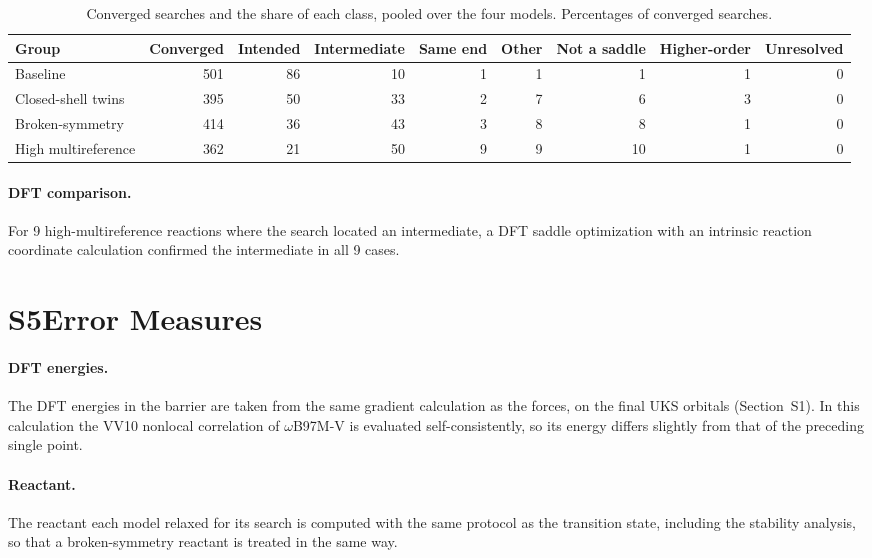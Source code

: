 \begin{table}[h]
  \caption{Converged searches and the share of each class, pooled over the four models. Percentages of converged searches.}
  \begin{tabular}{lrrrrrrrr}
    \hline
    Group & Converged & Intended & Intermediate & Same end & Other & Not a saddle & Higher-order & Unresolved \\
    \hline
    Baseline           & 501 & 86 & 10 & 1 & 1 & 1  & 1 & 0 \\
    Closed-shell twins & 395 & 50 & 33 & 2 & 7 & 6  & 3 & 0 \\
    Broken-symmetry    & 414 & 36 & 43 & 3 & 8 & 8  & 1 & 0 \\
    High multireference& 362 & 21 & 50 & 9 & 9 & 10 & 1 & 0 \\
    \hline
  \end{tabular}
\end{table}

\paragraph{DFT comparison.} For 9 high-multireference reactions where the search located an intermediate, a DFT saddle optimization with an intrinsic reaction coordinate calculation confirmed the intermediate in all 9 cases.

\section{S5\quad Error Measures}
\paragraph{DFT energies.} The DFT energies in the barrier are taken from the same gradient calculation as the forces, on the final UKS orbitals (Section~S1). In this calculation the VV10 nonlocal correlation of $\omega$B97M-V is evaluated self-consistently, so its energy differs slightly from that of the preceding single point.

\paragraph{Reactant.} The reactant each model relaxed for its search is computed with the same protocol as the transition state, including the stability analysis, so that a broken-symmetry reactant is treated in the same way.

